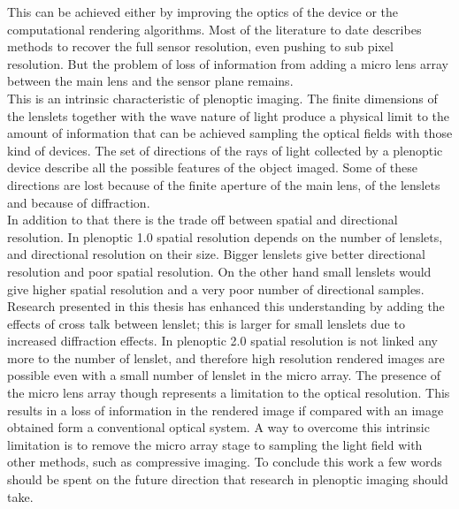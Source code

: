 This can be achieved either by improving the optics of the device or the computational rendering algorithms. Most of the literature to date describes methods to recover the full sensor resolution, even pushing to sub pixel resolution. But the problem of loss of information from adding a micro lens array between the main lens and the sensor plane remains. 
\\
This is an intrinsic characteristic of plenoptic imaging. The finite dimensions of the lenslets together with the wave nature of light produce a physical limit to the amount of information that can be achieved sampling the optical fields with those kind of devices. The set of directions of the rays of light collected by a plenoptic device describe all the possible features of the object imaged. Some of these directions are lost because of the finite aperture of the main lens, of the lenslets and because of diffraction. 
\\
In addition to that there is the trade off between spatial and directional resolution. In plenoptic 1.0 spatial resolution depends on the number of lenslets, and directional resolution on their size. Bigger lenslets give better directional resolution and poor spatial resolution. On the other hand small lenslets would give higher spatial resolution and a very poor number of directional samples. Research presented in this thesis has enhanced this understanding by adding the effects of cross talk between lenslet; this is larger for small lenslets due to increased diffraction effects. In plenoptic 2.0 spatial resolution is not linked any more to the number of lenslet, and therefore high resolution rendered images are possible even with a small number of lenslet in the micro array. The presence of the micro lens array though represents a limitation to the optical resolution. This results in a loss of information in the rendered image if compared with an image obtained form a conventional optical system. A way to overcome this intrinsic limitation is to remove the micro array stage to sampling the light field with other methods, such as compressive imaging.
To conclude this work a few words should be spent on the future direction that research in plenoptic imaging should take. \\
